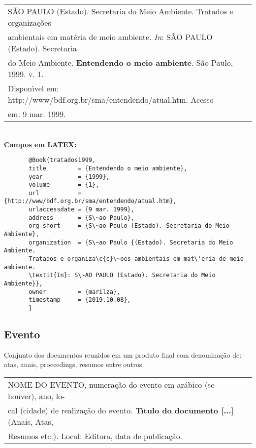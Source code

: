 		 
	 \begin{tabular}{|l|c|} \hline
	 	S\~AO PAULO (Estado). Secretaria do Meio Ambiente. Tratados e organiza\c{c}\~oes\\ ambientais em mat\'eria de meio ambiente. \textit{In}: S\~AO PAULO (Estado). Secretaria \\ do Meio Ambiente. \textbf{Entendendo o meio ambiente}. S\~ao Paulo, 1999. v. 1. \\ Dispon\'{\i}vel em: http://www/bdf.org.br/sma/entendendo/atual.htm. Acesso \\ em: 9 mar. 1999.  \\\hline
	 \end{tabular} \\ 
	 
	  \textbf{Campos em LATEX:} 

	  \begin{verbatim}
	   @Book{tratados1999,
	   title         = {Entendendo o meio ambiente},
	   year          = {1999},
	   volume        = {1},
	   url           = {http://www/bdf.org.br/sma/entendendo/atual.htm},
	   urlaccessdate = {9 mar. 1999},
	   address       = {S\~ao Paulo},
	   org-short     = {S\~ao Paulo (Estado). Secretaria do Meio Ambiente},
	   organization  = {S\~ao Paulo {(Estado). Secretaria do Meio Ambiente. 
	   Tratados e organiza\c{c}\~oes ambientais em mat\'eria de meio ambiente. 
	   \textit{In}: S\~AO PAULO (Estado). Secretaria do Meio Ambiente}},
	   owner         = {marilza},
	   timestamp     = {2019.10.08},
	   }
	 \end{verbatim}
	 
	

\subsection{Evento}

Conjunto dos documentos reunidos em um produto final com denomina\c{c}\~ao
de: atas, anais, proceedings, resumos entre outros. \\

\begin{tabular}{|l|c|} \hline
	
	NOME DO EVENTO, numera\c{c}\~ao do evento em ar\'abico (se
	houver), ano, lo-\\cal (cidade) de realiza\c{c}\~ao do evento. \textbf{T\'{\i}tulo do documento [...]} (Anais, Atas, \\Resumos etc.). Local: Editora, data de publica\c{c}\~ao. \\\hline
\end{tabular} \\ 

